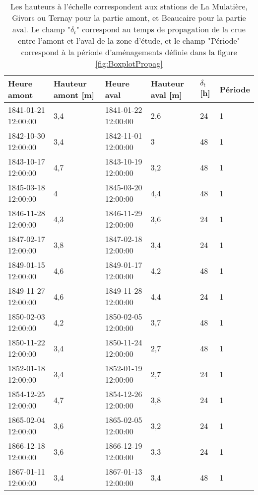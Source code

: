 \documentclass[11pt]{article}
\begin{document}
\centering
\begin{longtable}{|l|p{2.3cm}|l|p{2.3cm}|l|l|}
	\caption{Les hauteurs à l'échelle correspondent aux stations de La Mulatière, Givors ou Ternay pour la partie amont, et Beaucaire pour la partie aval. Le champ "$\delta_t$" correspond au temps de propagation de la crue entre l'amont et l'aval de la zone d'étude, et le champ "Période" correspond à la période d'aménagements définie dans la figure \ref{fig:BoxplotPropag}}
	\label{tab:Propag}\\

        \hline
        \textbf{Heure amont} & \textbf{Hauteur amont [m]} & \textbf{Heure aval} & \textbf{Hauteur aval [m]} & \textbf{$\delta_t$[h]} & \textbf{Période} \\ \hline
        \endhead
        
        1841-01-21 12:00:00 & 3,4 & 1841-01-22 12:00:00 & 2,6 & 24 & 1 \\ \hline
        1842-10-30 12:00:00 & 3,4 & 1842-11-01 12:00:00 & 3 & 48 & 1 \\ \hline
        1843-10-17 12:00:00 & 4,7 & 1843-10-19 12:00:00 & 3,2 & 48 & 1 \\ \hline
        1845-03-18 12:00:00 & 4 & 1845-03-20 12:00:00 & 4,4 & 48 & 1 \\ \hline
        1846-11-28 12:00:00 & 4,3 & 1846-11-29 12:00:00 & 3,6 & 24 & 1 \\ \hline
        1847-02-17 12:00:00 & 3,8 & 1847-02-18 12:00:00 & 3,4 & 24 & 1 \\ \hline
        1849-01-15 12:00:00 & 4,6 & 1849-01-17 12:00:00 & 4,2 & 48 & 1 \\ \hline
        1849-11-27 12:00:00 & 4,6 & 1849-11-28 12:00:00 & 4,4 & 24 & 1 \\ \hline
        1850-02-03 12:00:00 & 4,2 & 1850-02-05 12:00:00 & 3,7 & 48 & 1 \\ \hline
        1850-11-22 12:00:00 & 3,4 & 1850-11-24 12:00:00 & 2,7 & 48 & 1 \\ \hline
        1852-01-18 12:00:00 & 3,4 & 1852-01-19 12:00:00 & 2,7 & 24 & 1 \\ \hline
        1854-12-25 12:00:00 & 4,7 & 1854-12-26 12:00:00 & 3,8 & 24 & 1 \\ \hline
        1865-02-04 12:00:00 & 3,6 & 1865-02-05 12:00:00 & 3,2 & 24 & 1 \\ \hline
        1866-12-18 12:00:00 & 3,6 & 1866-12-19 12:00:00 & 3,3 & 24 & 1 \\ \hline
        1867-01-11 12:00:00 & 3,4 & 1867-01-13 12:00:00 & 3,4 & 48 & 1 \\ \hline

\end{longtable}
\end{document}
